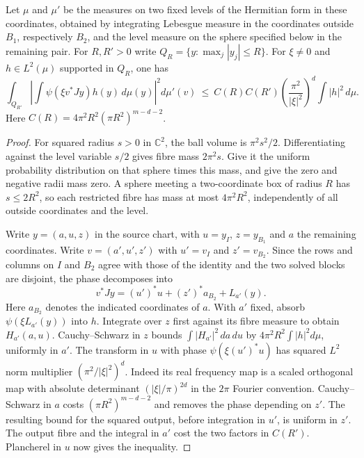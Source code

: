 \begin{lemma}
Let $\mu$ and $\mu'$ be the measures on two fixed levels of the Hermitian form in these coordinates, obtained by integrating Lebesgue measure in the coordinates outside $B_1$, respectively $B_2$, and the level measure on the sphere specified below in the remaining pair. For $R,R'>0$ write $Q_R=\{y:\max_j|y_j|\le R\}$. For $\xi\ne0$ and $h\in L^2(\mu)$ supported in $Q_R$, one has
\[
 \int_{Q_{R'}}\!\left|\int \psi(\xi v^*Jy) h(y)\,d\mu(y)\right|^2\!d\mu'(v)
 \ \le\ C(R)C(R')\left(\frac{\pi^2}{|\xi|^2}\right)^d\!\int |h|^2\,d\mu.
\]
Here $C(R)=4\pi^2 R^2(\pi R^2)^{m-d-2}$.
\end{lemma}
\begin{proof}
For squared radius $s>0$ in $\mathbb C^2$, the ball volume is $\pi^2s^2/2$. Differentiating against the level variable $s/2$ gives fibre mass $2\pi^2s$. Give it the uniform probability distribution on that sphere times this mass, and give the zero and negative radii mass zero. A sphere meeting a two-coordinate box of radius $R$ has $s\le 2R^2$, so each restricted fibre has mass at most $4\pi^2R^2$, independently of all outside coordinates and the level.

Write $y=(a,u,z)$ in the source chart, with $u=y_I$, $z=y_{B_1}$ and $a$ the remaining coordinates. Write $v=(a',u',z')$ with $u'=v_I$ and $z'=v_{B_2}$. Since the rows and columns on $I$ and $B_2$ agree with those of the identity and the two solved blocks are disjoint, the phase decomposes into
\[
 v^*Jy=(u')^*u+(z')^*a_{B_2}+L_{a'}(y).
\]
Here $a_{B_2}$ denotes the indicated coordinates of $a$. With $a'$ fixed, absorb $\psi(\xi L_{a'}(y))$ into $h$. Integrate over $z$ first against its fibre measure to obtain $H_{a'}(a,u)$. Cauchy--Schwarz in $z$ bounds $\int |H_{a'}|^2\,da\,du$ by $4\pi^2R^2\int |h|^2d\mu$, uniformly in $a'$. The transform in $u$ with phase $\psi(\xi (u')^*u)$ has squared $L^2$ norm multiplier $(\pi^2/|\xi|^2)^d$. Indeed its real frequency map is a scaled orthogonal map with absolute determinant $(|\xi|/\pi)^{2d}$ in the $2\pi$ Fourier convention. Cauchy--Schwarz in $a$ costs $(\pi R^2)^{m-d-2}$ and removes the phase depending on $z'$. The resulting bound for the squared output, before integration in $u'$, is uniform in $z'$. The output fibre and the integral in $a'$ cost the two factors in $C(R')$. Plancherel in $u$ now gives the inequality.
\end{proof}

